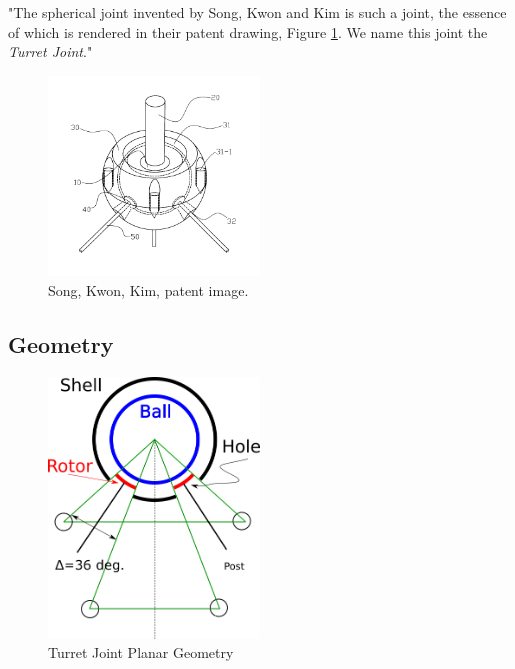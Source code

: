 \documentclass[11pt]{article}
\begin{document}
"The spherical joint invented by Song, Kwon and Kim \cite{song2003spherical} is such a joint,
the essence of which is rendered in their patent drawing, Figure \ref{SongKwonKimImage}.
We name this joint the \emph{Turret Joint}."

\begin{figure}[H]
  \centering
    \includegraphics[width=0.5\textwidth]{figures/SongKwonKimImage.png}
    \caption[Song, Kwon, Kim, patent image.]{Song, Kwon, Kim, patent image.}
      \label{SongKwonKimImage}
\end{figure}


\subsection{Geometry}

\begin{figure}[H]
  \centering
  \includegraphics[width=0.5\textwidth]{figures/SimplifiedConstraintDrawing.png}
    \caption[Turret Joint Planar Geometry]{Turret Joint Planar Geometry}
      \label{simplified-constraint-drawing}
\end{figure}
\end{document}

